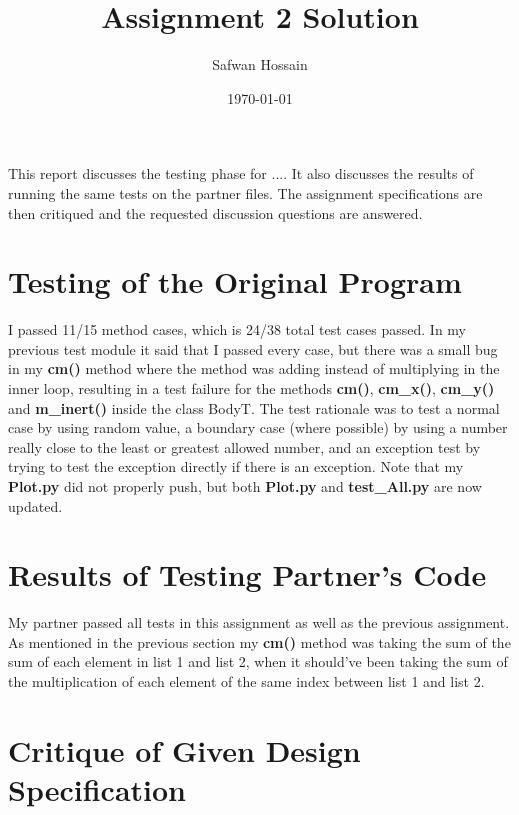 \documentclass[12pt]{article}
\title{Assignment 2 Solution}
\author{Safwan Hossain}
\date{\today}
\begin{document}
\maketitle

This report discusses the testing phase for .... It also discusses the results
of running the same tests on the partner files. The assignment specifications
are then critiqued and the requested discussion questions are answered.

\section{Testing of the Original Program}
	
	I passed 11/15 method cases, which is 24/38 total test cases passed. In my previous test module it said that I passed every case, but there was a small bug in my \textbf{cm()} method where the method was adding instead of multiplying in the inner loop, resulting in a test failure for the methods \textbf{cm()}, \textbf{cm\_x()}, \textbf{cm\_y()} and \textbf{m\_inert()} inside the class BodyT. The test rationale was to test a normal case by using random value, a boundary case (where possible) by using a number really close to the least or greatest allowed number, and an exception test by trying to test the exception directly if there is an exception. Note that my \textbf{Plot.py} did not properly push, but both \textbf{Plot.py} and \textbf{test\_All.py} are now updated.

\section{Results of Testing Partner's Code}
	
	My partner passed all tests in this assignment as well as the previous assignment. As mentioned in the previous section my \textbf{cm()} method was taking the sum of the sum of each element in list 1 and list 2, when it should’ve been taking the sum of the multiplication of each element of the same index between list 1 and list 2.

\section{Critique of Given Design Specification}
	
\end{document}
